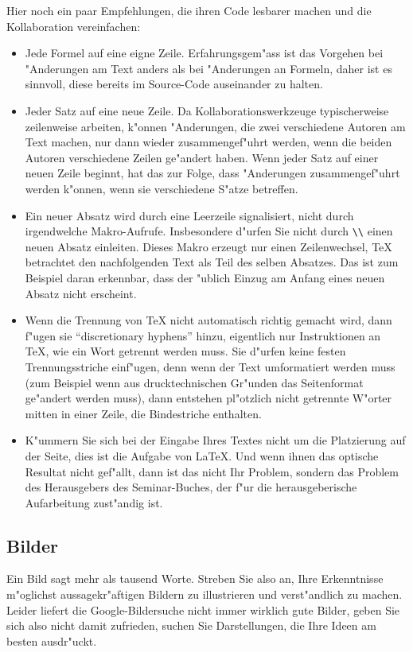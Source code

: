 \documentclass[a4paper,12pt]{article}
\begin{document}
Hier noch ein paar Empfehlungen, die ihren Code lesbarer machen und
die Kollaboration vereinfachen:
\begin{itemize}
\item Jede Formel auf eine eigne Zeile. 
Erfahrungsgem"ass ist das Vorgehen bei "Anderungen am Text anders
als bei "Anderungen an Formeln, daher ist es sinnvoll, diese bereits
im Source-Code auseinander zu halten.
\item Jeder Satz auf eine neue Zeile. 
Da Kollaborationswerkzeuge typischerweise zeilenweise arbeiten,
k"onnen "Anderungen, die zwei verschiedene Autoren am Text machen,
nur dann wieder zusammengef"uhrt werden, wenn die beiden Autoren
verschiedene Zeilen ge"andert haben.
Wenn jeder Satz auf einer neuen Zeile beginnt, hat das zur Folge, dass
"Anderungen zusammengef"uhrt werden k"onnen, wenn sie verschiedene 
S"atze betreffen.
\item Ein neuer Absatz wird durch eine Leerzeile signalisiert, nicht
durch irgendwelche Makro-Aufrufe.
Insbesondere d"urfen Sie nicht durch \verb+\\+ einen neuen Absatz
einleiten.
Dieses Makro erzeugt nur einen Zeilenwechsel, \TeX{} betrachtet den
nachfolgenden Text als Teil des selben Absatzes.
Das ist zum Beispiel daran erkennbar, dass der "ublich Einzug am Anfang
eines neuen Absatz nicht erscheint.
\item Wenn die Trennung von \TeX{} nicht automatisch richtig gemacht
wird, dann f"ugen sie ``discretionary hyphens'' hinzu, eigentlich nur
Instruktionen an \TeX, wie ein Wort getrennt werden muss. 
Sie d"urfen keine festen Trennungsstriche einf"ugen, denn wenn der
Text umformatiert werden muss (zum Beispiel wenn aus drucktechnischen
Gr"unden das Seitenformat ge"andert werden muss), dann entstehen
pl"otzlich nicht getrennte W"orter mitten in einer Zeile,
die Bindestriche enthalten.
\item K"ummern Sie sich bei der Eingabe Ihres Textes nicht um die
Platzierung auf der Seite, dies ist die Aufgabe von \LaTeX.
Und wenn ihnen das optische Resultat nicht gef"allt, dann ist das nicht
Ihr Problem, sondern das Problem des Herausgebers des Seminar-Buches,
der f"ur die herausgeberische Aufarbeitung zust"andig ist.
\end{itemize}

\subsection{Bilder}
Ein Bild sagt mehr als tausend Worte.
Streben Sie also an, Ihre Erkenntnisse m"oglichst aussagekr"aftigen
Bildern zu illustrieren und verst"andlich zu machen.
Leider liefert die Google-Bildersuche nicht immer wirklich gute Bilder,
geben Sie sich also nicht damit zufrieden, suchen Sie Darstellungen,
die Ihre Ideen am besten ausdr"uckt.
\end{document}
